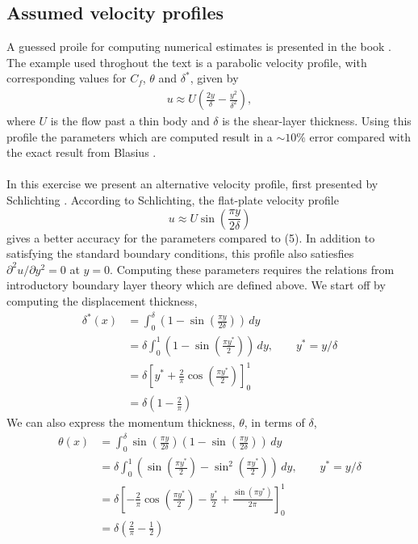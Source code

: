 \documentclass[12pt]{amsart}
\begin{document}
\subsection*{Assumed velocity profiles}
A guessed proile for computing numerical estimates is presented in the book \cite{frankwhite}. The example used throghout the text is a parabolic velocity profile, with corresponding values for $C_f$, $\theta$ and $\delta^*$, given by
\begin{align}
  u \approx U\left( \frac{2y}{\delta} - \frac{y^2}{\delta^2}\right),
\end{align}
where $U$ is the flow past a thin body and $\delta$ is the shear-layer thickness.
Using this profile the parameters which are computed result in a $\sim10\%$ error compared with the exact result from Blasius \cite{blasius}.\\\\
In this exercise we present an alternative velocity profile, first presented by Schlichting \cite{schli}. 
According to Schlichting, the flat-plate velocity profile
\[
  u \approx U\sin \left( \frac{\pi y}{2\delta} \right)
\]
gives a better accuracy for the parameters compared to (5). 
In addition to satisfying the standard boundary conditions, this profile also satiesfies $\partial^2 u / \partial y^2 = 0 $ at $y=0$.
Computing these parameters requires the relations from introductory boundary layer theory which are defined above. We start off by computing the displacement thickness,
\begin{align*}
  \delta^*(x) &= \int_0^{\delta} \left( 1 - \sin \left(\frac{\pi y}{2\delta} \right) \right)\, dy\\
  &= \delta \int_0^1 \left( 1 - \sin \left(\frac{\pi y^*}{2} \right) \right)\, dy, \qquad y^* = y / \delta\\
  &= \delta \left[ y^* + \frac{2}{\pi}\cos \left(\frac{\pi y^*}{2} \right) \right]^1_0\\
  &= \delta \left(1 - \frac{2}{\pi} \right)
\end{align*}
We can also express the momentum thickness, $\theta$, in terms of $\delta$,
\begin{align*}
  \theta(x) &= \int_0^{\delta} \sin \left( \frac{\pi y}{2 \delta} \right)\left( 1 - \sin \left( \frac{\pi y}{2 \delta} \right) \right) \, dy\\
  &= \delta\int_0^1 \left( \sin \left( \frac{\pi y^*}{2 } \right) - \sin^2 \left( \frac{\pi y^*}{2 } \right) \right)\, dy, \qquad y^* = y/\delta\\
  &= \delta \left[-\frac{2}{\pi}\cos \left( \frac{\pi y^*}{2}\right) - \frac{y^*}{2} + \frac{\sin(\pi y^*)}{2\pi}   \right]_0^1\\
  &= \delta \left(\frac{2}{\pi} - \frac{1}{2} \right)
\end{align*}
\end{document}

